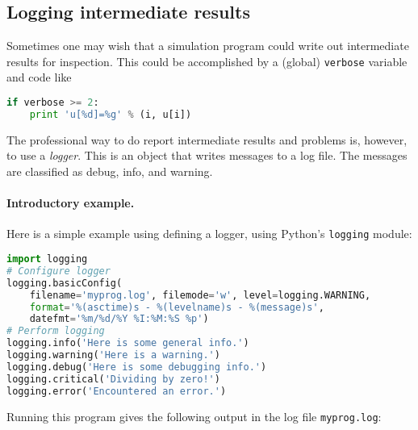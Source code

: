 \documentclass[graybox,sectrefs,envcountresetchap,open=right,final]{svmonodo}
\begin{document}
\subsection{Logging intermediate results}
\label{softeng1:basic:logging}


Sometimes one may wish that a simulation program could write out
intermediate results for inspection. This could be accomplished by
a (global) \texttt{verbose} variable and code like




\begin{lstlisting}[language=python,style=blue1_bluegreen]
if verbose >= 2:
    print 'u[%d]=%g' % (i, u[i])

\end{lstlisting}

The professional way to do report intermediate results and problems is,
however, to use a \emph{logger}. This is an object that writes messages
to a log file. The messages are classified as debug, info, and warning.

\paragraph{Introductory example.}
Here is a simple example using defining a logger, using Python's \texttt{logging}
module:














\begin{lstlisting}[language=python,style=blue1bar_bluegreen]
import logging
# Configure logger
logging.basicConfig(
    filename='myprog.log', filemode='w', level=logging.WARNING,
    format='%(asctime)s - %(levelname)s - %(message)s',
    datefmt='%m/%d/%Y %I:%M:%S %p')
# Perform logging
logging.info('Here is some general info.')
logging.warning('Here is a warning.')
logging.debug('Here is some debugging info.')
logging.critical('Dividing by zero!')
logging.error('Encountered an error.')

\end{lstlisting}

Running this program gives the following output in the log file \texttt{myprog.log}:
\end{document}
